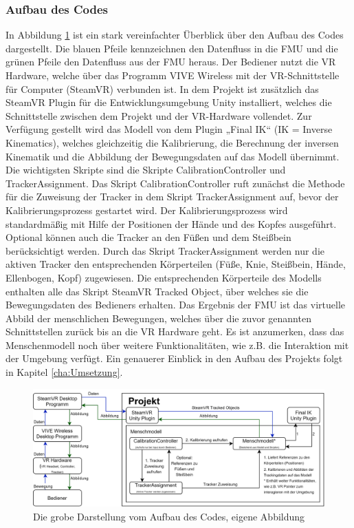\subsubsection{Aufbau des Codes}\label{sec:CCode}
In Abbildung \ref{fig:CodeDarstellung} ist ein stark vereinfachter Überblick über den Aufbau des Codes dargestellt. Die blauen Pfeile kennzeichnen den Datenfluss in die FMU und die grünen Pfeile den Datenfluss aus der FMU heraus. Der Bediener nutzt die VR Hardware, welche über das Programm VIVE Wireless mit der VR-Schnittstelle für Computer (SteamVR) verbunden ist. In dem Projekt ist zusätzlich das SteamVR Plugin für die Entwicklungsumgebung Unity installiert, welches die Schnittstelle zwischen dem Projekt und der VR-Hardware vollendet. Zur Verfügung gestellt wird das Modell von dem Plugin „Final IK“ (IK = Inverse Kinematics), welches gleichzeitig die Kalibrierung, die Berechnung der inversen Kinematik und die Abbildung der Bewegungsdaten auf das Modell übernimmt. Die wichtigsten Skripte sind die Skripte CalibrationController und TrackerAssignment. Das Skript CalibrationController ruft zunächst die Methode für die Zuweisung der Tracker in dem Skript TrackerAssignment auf, bevor der Kalibrierungsprozess gestartet wird. Der Kalibrierungsprozess wird standardmäßig mit Hilfe der Positionen der Hände und des Kopfes ausgeführt. Optional können auch die Tracker an den Füßen und dem Steißbein berücksichtigt werden. Durch das Skript TrackerAssignment werden nur die aktiven Tracker den entsprechenden Körperteilen (Füße, Knie, Steißbein, Hände, Ellenbogen, Kopf) zugewiesen. Die entsprechenden Körperteile des Modells enthalten alle das Skript SteamVR Tracked Object, über welches sie die Bewegungsdaten des Bedieners erhalten. Das Ergebnis der FMU ist das virtuelle Abbild der menschlichen Bewegungen, welches über die zuvor genannten Schnittstellen zurück bis an die VR Hardware geht. Es ist anzumerken, dass das Menschenmodell noch über weitere Funktionalitäten, wie z.B. die Interaktion mit der Umgebung verfügt. Ein genauerer Einblick in den Aufbau des Projekts folgt in Kapitel \ref{cha:Umsetzung}.
\begin{figure}[h]
	\centering
	\includegraphics[width=0.9\linewidth]{Bilder/A25_CodeDarstellung}
	\caption{Die grobe Darstellung vom Aufbau des Codes, eigene Abbildung}
	\label{fig:CodeDarstellung}
\end{figure}

